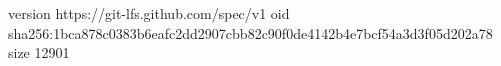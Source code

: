 version https://git-lfs.github.com/spec/v1
oid sha256:1bca878c0383b6eafc2dd2907cbb82c90f0de4142b4e7bcf54a3d3f05d202a78
size 12901
